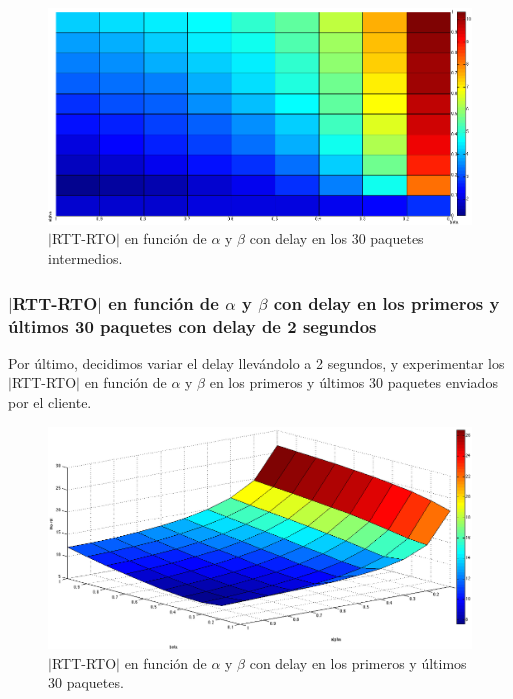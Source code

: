 \documentclass[10pt, a4paper]{article}
\begin{document}
\begin{figure}[H]
\begin{center}
\includegraphics[width=17cm]{delay-30I.png}
\caption{$|$RTT-RTO$|$ en función de $\alpha$ y $\beta$ con delay en los 30 paquetes intermedios.}
\end{center}
\end{figure}



\subsubsection{$|$RTT-RTO$|$ en función de $\alpha$ y $\beta$ con delay en los primeros y últimos 30 paquetes con delay de 2 segundos}
Por último, decidimos variar el delay llevándolo a 2 segundos, y experimentar los $|$RTT-RTO$|$ en función de $\alpha$ y $\beta$ en los primeros y últimos 30 paquetes enviados por el cliente.

\begin{figure}[H]
\begin{center}
\includegraphics[width=17cm]{delay-30F30L-2seg.png}
\caption{$|$RTT-RTO$|$ en función de $\alpha$ y $\beta$ con delay en los primeros y últimos 30 paquetes.}
\end{center}
\end{figure}
\end{document}
